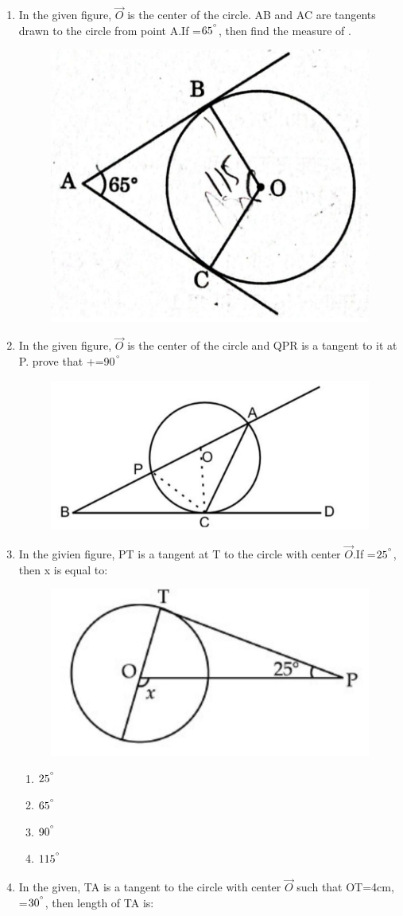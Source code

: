 \documentclass{article}
\begin{document}
\begin{enumerate}
		\item In the given figure, $\vec{O}$ is the center of the circle. AB and AC are tangents drawn to the circle from point A.If =$65^{\degree}$, then find the measure of .
		\begin{figure}[h]
			\centering
			\includegraphics[width=0.35\columnwidth]{fig7.jpg}
		\end{figure}
	\item In the given figure, $\vec{O}$ is the center of the circle and QPR is a tangent to it at P. prove that +=90$^{\degree}$
		\begin{figure}[h]
			\centering
			\includegraphics[width=0.35\columnwidth]{fig8.jpg}
		\end{figure}
	\item In the givien figure, PT is a tangent at T to the circle  with center $\vec{O}$.If =$25^{\degree}$, then x is equal to:
		\begin{figure}[h]
			\centering
			\includegraphics[width=0.4\columnwidth]{fig9.jpg}
		\end{figure}
		\begin{enumerate}
			\item $25^{\degree}$
			\item $65^{\degree}$
			\item $90^{\degree}$
			\item $115^{\degree}$
		\end{enumerate}
	\item In the given, TA is a tangent to the circle with center $\vec{O}$ such that OT=4cm, =$30^{\degree}$, then length of TA is:

\end{enumerate}
\end{document}

